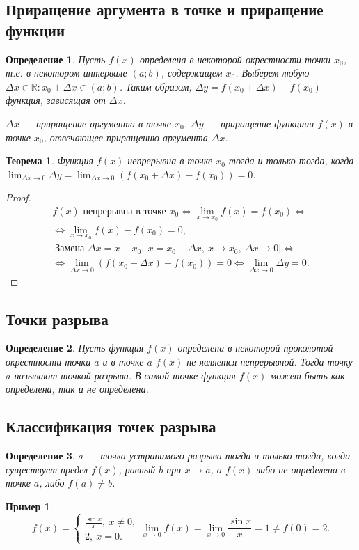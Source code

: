 \documentclass[a4paper,12pt]{article} %
\newtheorem{definition}{Определение}[section]
\newtheorem{theorem}{Теорема}[section]
\theoremstyle{remark}
\theoremstyle{definition}
\newtheorem{exmp}{Пример}[section]
\begin{document}
\subsection{Приращение аргумента в точке и приращение функции}
\begin{definition}
Пусть $f(x)$ определена в некоторой окрестности точки $x_0$, т.е. в некотором интервале $(a; b)$, содержащем $x_0$. Выберем любую $\Delta x \in \mathbb{R} : x_0+\Delta x \in (a; b)$. Таким образом, $\Delta y = f(x_0 + \Delta x) - f(x_0)$ --- функция, зависящая от $\Delta x$.

$\Delta x$ --- приращение аргумента в точке $x_0$.
$\Delta y$ --- приращение функциии $f(x)$ в точке $x_0$, отвечающее приращению аргумента $\Delta x$.
\end{definition}

\begin{theorem}
	Функция $f(x)$ непрерывна в точке $x_0$ тогда и только тогда, когда $\lim_{\Delta x \to 0} \Delta y = \lim_{\Delta x \to 0} (f(x_0+\Delta x) - f(x_0)) = 0$.
\end{theorem}
\begin{proof}
	\begin{multline}
		f(x) \text{ непрерывна в точке } x_0 \iff \lim_{x \to x_0} f(x) = f(x_0) \iff \\
		\iff \lim_{x \to x_0} f(x) - f(x_0) = 0, \\
		| \text{Замена } \Delta x = x - x_0, \ x = x_0 + \Delta x, \ x \to x_0, \ \Delta x \to 0 | \iff \\
		\iff \lim_{\Delta x \to 0} (f(x_0 + \Delta x) - f(x_0)) = 0 \iff \lim_{\Delta x \to 0} \Delta y = 0.
	\end{multline}
\end{proof}


\subsection{Точки разрыва}
\begin{definition}
	Пусть функция $f(x)$ определена в некоторой проколотой окрестности точки $a$ и в точке $a$ $f(x)$ не является непрерывной. Тогда точку $a$ называют точкой разрыва. В самой точке функция $f(x)$ может быть как определена, так и не определена.
\end{definition}

\subsection{Классификация точек разрыва}
\begin{definition}
	$a$ --- точка устранимого разрыва тогда и только тогда, когда существует предел $f(x)$, равный $b$ при $x \to a$, а $f(x)$ либо не определена в точке $a$, либо $f(a)\neq b$.	
\end{definition}
\begin{exmp}
	\[
	f(x) = \begin{cases}
		\frac{\sin x}{x}, \ x \neq 0, \\
		2, \ x = 0.
	\end{cases}
	\lim_{x \to 0} f(x) = \lim_{x \to 0} \frac{\sin x}{x} = 1 \neq f(0) = 2
	.\] 
\end{exmp}
\end{document}
